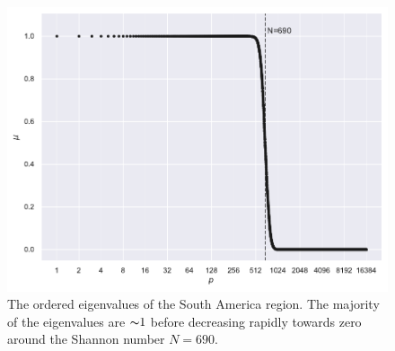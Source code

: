 \begin{figure}[htpb]
\centering\capstart{}
\includegraphics[width=\textwidth]{south_america_eigenvalues_L128.pdf}
\caption[
The Slepian eigenvalues of the South America region
]{
The ordered eigenvalues of the South America region.
The majority of the eigenvalues are \({\thicksim}\num{1}\) before decreasing rapidly towards zero around the Shannon number \(N=690\).
}\label{fig:chapter4_eigenvalues}
\end{figure}
